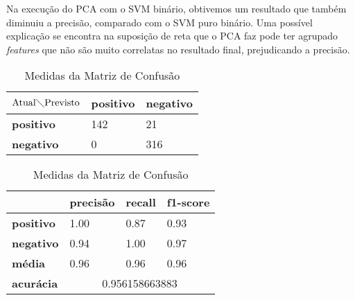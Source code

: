 Na execução do PCA com o SVM binário, obtivemos um resultado que também diminuiu a precisão, comparado com o SVM puro binário. Uma possível explicação se encontra na suposição de reta que o PCA faz pode ter agrupado \emph{features} que não são muito correlatas no resultado final, prejudicando a precisão.
             


\begin{table}[h!]
\centering
\begin{minipage}[b]{0.45\linewidth}
\caption{Matriz de Confusão Binária: \textit{Naïve Bayes}}
\label{tab:mcb-nb}
\begin{tabular}{|l|l|l|}
\hline
$\textrm{Atual}\diagdown\textrm{Previsto}$ & \textbf{positivo} & \textbf{negativo} \\ \hline
\textbf{positivo}     & 142                 & 21   \\ \hline
\textbf{negativo}     & 0                   & 316 \\ \hline
\end{tabular}
\end{minipage}
\hspace{0.5cm}
\begin{minipage}[b]{0.45\linewidth}

\centering
\caption{Medidas da Matriz de Confusão}
\label{tab:mmcb-nb}
\begin{tabular}{|l|l|l|l|}
\hline
         & \textbf{precisão} & \textbf{recall} & \textbf{f1-score} \\ \hline
\textbf{positivo} & 1.00     & 0.87   & 0.93     \\ \hline
\textbf{negativo} & 0.94     & 1.00   & 0.97     \\ \hline
\textbf{média}    & 0.96     & 0.96   & 0.96 \\ \hline
\textbf{acurácia} & \multicolumn{3}{|c|}{0.956158663883} \\ \hline
\end{tabular}
\end{minipage}
\end{table}

